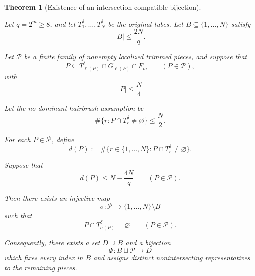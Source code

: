 \documentclass[11pt, letterpaper]{nyjm}
\newtheorem{theorem}{Theorem}[section]
\begin{document}
	\begin{theorem}[Existence of an intersection-compatible bijection]
		\label{thm:restricted-bijection}
		
		
		Let $q=2^m\ge 8$, and let
		$T_1^\delta,\ldots,T_N^\delta$ be the original tubes.
		Let $B\subseteq\{1,\ldots,N\}$ satisfy
		\[
		|B|\le \frac{2N}{q}.
		\]
		
		Let $\mathcal P$ be a finite family of nonempty
		localized trimmed pieces, 
		and suppose that
		\[
		P\subseteq T_{\ell(P)}^\delta
		\cap G_{\ell(P)}\cap F_m
		\qquad(P\in\mathcal P),
		\]
		with 
		\[
		|P| \leq \frac N4
		\]
		
		Let the no-dominant-hairbrush assumption be
		\[
		\#\{r:P\cap T_r^\delta\ne\varnothing\}
		\le \frac N2.
		\]
		
		For each $P\in\mathcal P$, define
		\[
		d(P):=
		\#\{r\in\{1,\ldots,N\}:
		P\cap T_r^\delta\ne\varnothing\}.
		\]
		
		Suppose that
		\[
		d(P)\le N-\frac{4N}{q}
		\qquad(P\in\mathcal P).
		\]
		
		Then there exists an injective map
		\[
		\sigma:\mathcal P\longrightarrow
		\{1,\ldots,N\}\setminus B
		\]
		such that
		\[
		P\cap T_{\sigma(P)}^\delta=\varnothing
		\qquad(P\in\mathcal P).
		\]
		
		Consequently, there exists a set
		$D\supseteq B$ and a bijection
		\[
		\Phi:B\sqcup\mathcal P\longrightarrow D
		\]
		which fixes every index in $B$ and assigns
		distinct nonintersecting representatives
		to the remaining pieces.
		
	\end{theorem}
	
\end{document}
